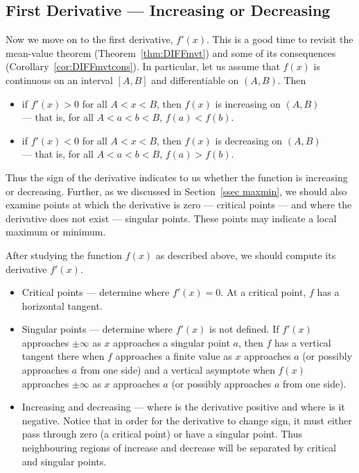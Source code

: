 \subsection{First Derivative --- Increasing or Decreasing}
Now we move on to the first derivative, $f'(x)$. This is a good time to revisit the
mean-value theorem (Theorem~\ref{thm:DIFFmvt}) and some of its consequences
(Corollary~\ref{cor:DIFFmvtcons}). In particular, let us assume that $f(x)$ is continuous
on an interval $[A,B]$ and differentiable on $(A,B)$. Then
\begin{itemize}
 \item if $f'(x)>0$ for all $A<x<B$, then $f(x)$ is increasing on $(A,B)$\\
  --- that is, for all $A<a<b<B$, $f(a)< f(b)$.
 \item if $f'(x)<0$ for all $A<x<B$, then $f(x)$ is decreasing on $(A,B)$\\
  --- that is, for all $A<a<b<B$, $f(a) > f(b)$.
\end{itemize}
Thus the sign of the derivative indicates to us whether the function is increasing or
decreasing. Further, as we discussed in Section~\ref{ssec maxmin}, we should also examine
points at which the derivative is zero --- critical points --- and where the derivative
does not exist --- singular points. These points may indicate a local maximum or minimum.

After studying the function $f(x)$ as described above, we should compute its derivative
$f'(x)$.
\begin{itemize}
 \item Critical points --- determine where $f'(x)=0$. At a critical point, $f$ has a
horizontal tangent.
 \item Singular points --- determine where $f'(x)$ is not defined.  If $f'(x)$
approaches $\pm\infty$ as $x$ approaches a singular point $a$, then $f$ has a
vertical tangent there when $f$ approaches a finite value as $x$ approaches $a$
(or possibly approaches $a$ from one side) and a vertical asymptote when $f(x)$
approaches $\pm\infty$ as $x$ approaches $a$ (or possibly approaches $a$ from
one side).

 \item Increasing and decreasing --- where is the derivative positive and where is it
negative. Notice that in order for the derivative to change sign, it must either pass
through zero (a critical point) or have a singular point. Thus neighbouring regions of
increase and decrease will be separated by critical and singular points.
\end{itemize}

